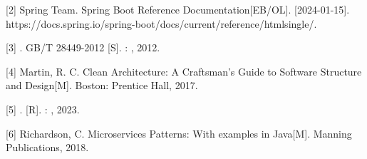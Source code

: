 {[}2{]} Spring Team. Spring Boot Reference Documentation{[}EB/OL{]}.
{[}2024-01-15{]}.
https://docs.spring.io/spring-boot/docs/current/reference/htmlsingle/.

{[}3{]} . GB/T 28449-2012 {[}S{]}. : , 2012.

{[}4{]} Martin, R. C. Clean Architecture: A Craftsman's Guide to
Software Structure and Design{[}M{]}. Boston: Prentice Hall, 2017.

{[}5{]} . {[}R{]}. : , 2023.

{[}6{]} Richardson, C. Microservices Patterns: With examples in
Java{[}M{]}. Manning Publications, 2018.

\subsection{}\label{section-9}

\subsubsection{}\label{section-10}

